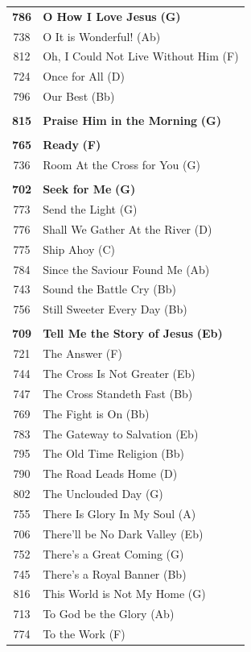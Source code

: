 \begin{small}
\begin{supertabular}{c l}
\textbf{786} & \textbf{O How I Love Jesus} \textbf{(G)} \\
738 & O It is Wonderful! (Ab) \\
812 & Oh, I Could Not Live Without Him (F) \\
724 & Once for All (D) \\
796 & Our Best (Bb) \\
 & \\
\textbf{815} & \textbf{Praise Him in the Morning} \textbf{(G)} \\
 & \\
\textbf{765} & \textbf{Ready} \textbf{(F)} \\
736 & Room At the Cross for You (G) \\
 & \\
\textbf{702} & \textbf{Seek for Me} \textbf{(G)} \\
773 & Send the Light (G) \\
776 & Shall We Gather At the River (D) \\
775 & Ship Ahoy (C) \\
784 & Since the Saviour Found Me (Ab) \\
743 & Sound the Battle Cry (Bb) \\
756 & Still Sweeter Every Day (Bb) \\
 & \\
\textbf{709} & \textbf{Tell Me the Story of Jesus} \textbf{(Eb)} \\
721 & The Answer (F) \\
744 & The Cross Is Not Greater (Eb) \\
747 & The Cross Standeth Fast (Bb) \\
769 & The Fight is On (Bb) \\
783 & The Gateway to Salvation (Eb) \\
795 & The Old Time Religion (Bb) \\
790 & The Road Leads Home (D) \\
802 & The Unclouded Day (G) \\
755 & There Is Glory In My Soul (A) \\
706 & There’ll be No Dark Valley (Eb) \\
752 & There’s a Great Coming (G) \\
745 & There’s a Royal Banner (Bb) \\
816 & This World is Not My Home (G) \\
713 & To God be the Glory (Ab) \\
774 & To the Work (F) \\

\end{supertabular}
\end{small}
